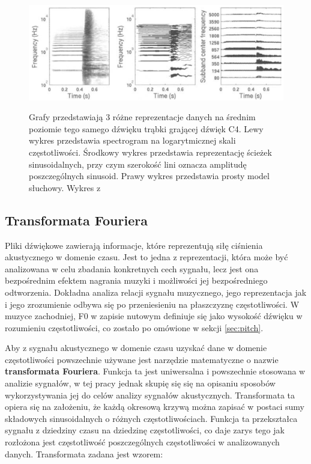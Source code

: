 \documentclass[12pt,a4paper,twoside]{mwart}
\begin{document}
\begin{figure}[t]
  \begin{center}
  \includegraphics[scale=0.3]{images/mid_level_representation.jpg}\\
  \caption{Grafy przedstawiają 3 różne reprezentacje danych na średnim poziomie tego samego dźwięku trąbki grającej dźwięk C4. Lewy wykres przedstawia spectrogram na logarytmicznej skali częstotliwości. Środkowy wykres przedstawia reprezentację ścieżek sinusoidalnych, przy czym szerokość lini oznacza amplitudę poszczególnych sinusoid. Prawy wykres przedstawia prosty model słuchowy. Wykres z \cite[14]{Transcription:Zatorre:AuditoryCortex}}
  \label{fig:mid_level_representation}
  \end{center}
\end{figure}

\subsection{Transformata Fouriera}\label{sec:TF}
Pliki dźwiękowe zawierają informacje, które reprezentują siłę ciśnienia akustycznego w domenie czasu. Jest to jedna z reprezentacji, która może być analizowana w celu zbadania konkretnych cech sygnału, lecz jest ona bezpośrednim efektem nagrania muzyki i możliwości jej bezpośredniego odtworzenia. Dokładna analiza relacji sygnału muzycznego, jego reprezentacja jak i jego zrozumienie odbywa się po przeniesieniu na płaszczyznę częstotliwości. W muzyce zachodniej, F0 w zapisie nutowym definiuje się jako wysokość dźwięku w rozumieniu częstotliwości, co zostało po omówione w sekcji \ref{sec:pitch}.

Aby z sygnału akustycznego w domenie czasu uzyskać dane w domenie częstotliwości powszechnie używane jest narzędzie matematyczne o nazwie \textbf{transformata Fouriera}. Funkcja ta jest uniwersalna i powszechnie stosowana w analizie sygnałów, w tej pracy jednak skupię się się na opisaniu sposobów wykorzystywania jej do celów analizy sygnałów akustycznych. Transformata ta opiera się na założeniu, że każdą okresową krzywą można zapisać w postaci sumy składowych sinusoidalnych o różnych częstotliwościach. Funkcja ta przekształca sygnału z dziedziny czasu na dziedzinę częstotliwości, co daje zarys tego jak rozłożona jest częstotliwość poszczególnych częstotliwości w analizowanych danych. Transformata zadana jest wzorem:
\end{document}
